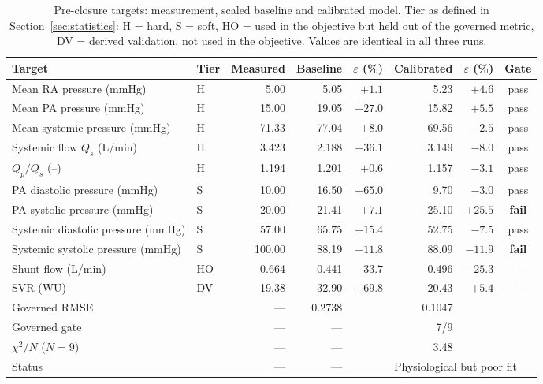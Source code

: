 \begin{table}[ht]
\centering\small
\setlength{\tabcolsep}{4pt}
\caption{Pre-closure targets: measurement, scaled baseline and calibrated model. Tier as defined in Section~\ref{sec:statistics}: H = hard, S = soft, HO = used in the objective but held out of the governed metric, DV = derived validation, not used in the objective. Values are identical in all three runs.}
\label{tab:pre_targets}
\begin{tabular}{llrrrrrc}
\toprule
\textbf{Target} & \textbf{Tier} & \textbf{Measured} & \textbf{Baseline} & $\varepsilon$ (\%) & \textbf{Calibrated} & $\varepsilon$ (\%) & \textbf{Gate} \\
\midrule
Mean RA pressure (mmHg) & H & 5.00 & 5.05 & $+1.1$ & 5.23 & $+4.6$ & pass \\
Mean PA pressure (mmHg) & H & 15.00 & 19.05 & $+27.0$ & 15.82 & $+5.5$ & pass \\
Mean systemic pressure (mmHg) & H & 71.33 & 77.04 & $+8.0$ & 69.56 & $-2.5$ & pass \\
Systemic flow $Q_s$ (L/min) & H & 3.423 & 2.188 & $-36.1$ & 3.149 & $-8.0$ & pass \\
$Q_p/Q_s$ (--) & H & 1.194 & 1.201 & $+0.6$ & 1.157 & $-3.1$ & pass \\
PA diastolic pressure (mmHg) & S & 10.00 & 16.50 & $+65.0$ & 9.70 & $-3.0$ & pass \\
PA systolic pressure (mmHg) & S & 20.00 & 21.41 & $+7.1$ & 25.10 & $+25.5$ & \textbf{fail} \\
Systemic diastolic pressure (mmHg) & S & 57.00 & 65.75 & $+15.4$ & 52.75 & $-7.5$ & pass \\
Systemic systolic pressure (mmHg) & S & 100.00 & 88.19 & $-11.8$ & 88.09 & $-11.9$ & \textbf{fail} \\
\midrule
Shunt flow (L/min) & HO & 0.664 & 0.441 & $-33.7$ & 0.496 & $-25.3$ & --- \\
SVR (WU) & DV & 19.38 & 32.90 & $+69.8$ & 20.43 & $+5.4$ & --- \\
\midrule
Governed RMSE & & --- & 0.2738 & & 0.1047 & & \\
Governed gate & & --- & --- & & 7/9 & & \\
$\chi^2/N$ ($N=9$) & & --- & --- & & 3.48 & & \\
Status & & --- & --- & & \multicolumn{3}{l}{Physiological but poor fit} \\
\bottomrule
\end{tabular}
\end{table}

